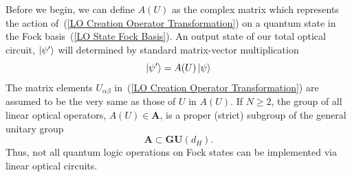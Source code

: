 \documentclass[aps,pra,twocolumn,showpacs,superscriptaddress,floatfix,10pt]{revtex4}
\begin{document}
Before we begin, we can define $A(U)$ as the complex matrix which represents the action of~(\ref{LO Creation Operator Transformation}) on a quantum state in the Fock basis~(\ref{LO State Fock Basis}). An output state of our total optical circuit, $\ket{\psi^\prime}$ will determined by standard matrix-vector multiplication
\begin{equation}
\label{Matrix Vector Product}
\ket{\psi^\prime} = A(U) \ket{\psi}
\end{equation}
The matrix elements $U_{\alpha \beta}$ in~(\ref{LO Creation Operator Transformation}) are assumed to be the very same as those of $U$ in $A(U)$. If $N \ge 2$, the group of all linear optical operators, $ A(U) \in \textbf{A}$, is a proper (strict) subgroup of the general unitary group
\begin{equation}
\label{Proper Subgroup}
\textbf{A} \subset \textbf{GU}(d_H).
\end{equation}
Thus, not all quantum logic operations on Fock states can be implemented via linear optical circuits.
\end{document}
